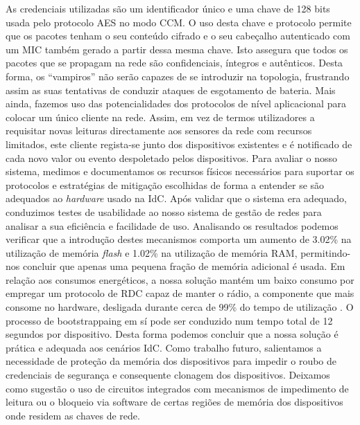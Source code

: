\documentclass{llncs}
\begin{document}
As credenciais utilizadas são um identificador único e uma chave de 128 bits usada pelo protocolo \ac{AES} \cite{Fips2001} no modo \ac{CCM}. 
O uso desta chave e protocolo permite que os pacotes tenham o seu conteúdo cifrado e o seu cabeçalho autenticado com um \ac{MIC} também gerado a partir dessa mesma chave. Isto assegura que todos os pacotes que se propagam na rede são confidenciais, íntegros e autênticos. 
Desta forma, os ``vampiros'' não serão capazes de se introduzir na topologia, frustrando assim as suas tentativas de conduzir ataques de esgotamento de bateria.
Mais ainda, fazemos uso das potencialidades dos protocolos de nível aplicacional para colocar um único cliente na rede. Assim, em vez de termos utilizadores a requisitar novas leituras directamente aos sensores da rede com recursos limitados, este cliente regista-se junto dos dispositivos existentes e é notificado de cada novo valor ou evento despoletado pelos dispositivos.
Para avaliar o nosso sistema, medimos e documentamos os recursos físicos necessários para suportar os protocolos e estratégias de mitigação escolhidas de forma a entender se são adequados ao \textit{hardware} usado na \ac{IdC}. Após validar que o sistema era adequado, conduzimos testes de usabilidade ao nosso sistema de gestão de redes para analisar a sua eficiência e facilidade de uso.
Analisando os resultados podemos verificar que a introdução destes mecanismos comporta um aumento de 3.02\% na utilização de memória \textit{flash} e 1.02\% na utilização de memória \ac{RAM}, permitindo-nos concluir que apenas uma pequena fração de memória adicional é usada.
Em relação aos consumos energéticos, a nossa solução mantém um baixo consumo por empregar um protocolo de \ac{RDC} capaz de manter o rádio, a componente que mais consome no hardware, desligada durante cerca de 99\% do tempo de utilização \cite{Dunkels2011}. O processo de bootstrappaing em sí pode ser conduzido num tempo total de 12 segundos por dispositivo.
Desta forma podemos concluir que a nossa solução é prática e adequada aos cenários \ac{IdC}.
Como trabalho futuro, salientamos a necessidade de proteção da memória dos dispositivos para impedir o roubo de credenciais de segurança e consequente clonagem dos dispositivos. Deixamos como sugestão o uso de circuitos integrados com mecanismos de impedimento de leitura ou o bloqueio via software de certas regiões de memória dos dispositivos onde residem as chaves de rede.
%



\end{document}
